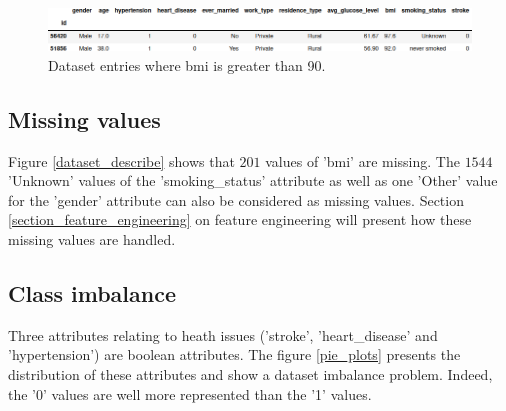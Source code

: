 \begin{figure}[H]
\centering
\includegraphics[scale=0.5]{figures/bmi_outliers_gt90.png}
\caption{Dataset entries where bmi is greater than 90.}
\label{large_bmi}
\end{figure}

\subsection{Missing values}
Figure \ref{dataset_describe} shows that $201$ values of 'bmi' are missing. The $1544$ 'Unknown' values 
of the 'smoking\_status' attribute as well as one 'Other' value for the 'gender' attribute can also be 
considered as missing values. Section \ref{section_feature_engineering} on feature engineering will 
present how these missing values are handled.


\subsection{Class imbalance}
\label{section_imbalance}
Three attributes relating to heath issues ('stroke', 'heart\_disease' and 'hypertension') are 
boolean attributes. The figure \ref{pie_plots} presents the distribution of these attributes and 
show a dataset imbalance problem. Indeed, the '0' values are well more represented than the '1' values. 

